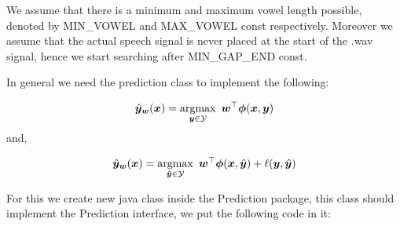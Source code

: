 \documentclass[11pt, oneside]{article}   	%
\begin{document}
We assume that there is a minimum and maximum vowel length possible, denoted by MIN\_VOWEL  and MAX\_VOWEL const respectively. Moreover we assume that the actual speech signal is never placed at the start of the .wav signal, hence we start searching after MIN\_GAP\_END const.

In general we need the prediction class to implement the following:

\begin{equation}
\label{eq:decoding}
\hat{\bm{y}}_{\bm{w}}(\bm{x}) = \operatorname*{argmax}_{\bm{y} \in \mathcal{Y}} ~ \bm{w}^\top \bm{\phi}(\bm{x}, \bm{y})
\end{equation}
and,

\begin{equation}
\label{eq:augmented-loss}
\hat{\bm{y}}_{\bm{w}}(\bm{x}) = \operatorname*{argmax}_{\hat{\bm{y}} \in \mathcal{Y}} ~ \bm{w}^\top \bm{\phi}(\bm{x}, \hat{\bm{y}}) + \ell (\bm{y},\hat{\bm{y}})
\end{equation}

For this we create new java class inside the Prediction package, this class should implement the Prediction interface, we put the following code in it:
\end{document}
